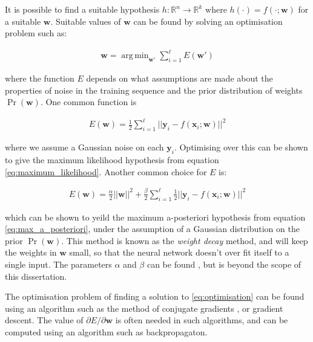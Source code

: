 \documentclass[12pt,twoside,notitlepage]{report}
\newcommand{\vc}[1]{\mathbf{#1}}
\newcommand{\bb}[1]{\mathbb{#1}}
\DeclareMathOperator*{\argmin}{arg\,min}
\begin{document}
                It is possible to find a suitable hypothesis $h:\bb{R}^n \rightarrow \bb{R}^k$ 
                where $h(\cdot) = f(\cdot;\vc{w})$ for a suitable $\vc{w}$. Suitable values of $\vc{w}$ can be found by 
                solving an optimisation problem such as:
                
                \begin{align}
                    \vc{w} = \argmin_{\vc{w}'} \sum\limits_{i=1}^\ell E(\vc{w'})
                    \label{eq:optimisation}
                \end{align}

                where the function $E$ depends on what assumptions are made about the properties of noise in the training sequence and the prior 
                distribution of weights $\Pr(\vc{w})$. One common function is 

                \begin{align}
                    E(\vc{w}) =  \frac{1}{2} \sum\limits_{i=1}^\ell || \vc{y}_i - f(\vc{x}_i;\vc{w}) || ^2
                \end{align}

                where we assume a Gaussian noise on each $\vc{y}_i$. Optimising over this can be shown to give the maximum
                likelihood hypothesis from equation \ref{eq:maximum_likelihood}\cite{russell1995modern}.
                Another common choice for $E$ is:

                \begin{align}
                    E(\vc{w}) = \frac{\alpha}{2} ||\vc{w}||^2 + \frac{\beta}{2} \sum\limits_{i=1}^\ell \frac{1}{2} || \vc{y}_i - f(\vc{x}_i;\vc{w}) || ^2
                 \end{align}

                 which can be shown to yeild the maximum a-posteriori hypothesis from equation \ref{eq:max_a_posteriori},
                 under the assumption of a Gaussian distribution on the prior $\Pr(\vc{w})$.
                 This method is known as the \textit{weight decay} method, and will keep the weights in $\vc{w}$ small, 
                 so that the neural network doesn't over fit itself to a single input. The parameters $\alpha$ and $\beta$ can be 
                 found \cite{eq:max_likelihood}, but is beyond the scope of this dissertation. \cite{russell1995modern}

                 The optimisation problem of finding a solution to \ref{eq:optimisation} can be found using an algorithm 
                 such as the method of conjugate gradients \cite{shewchuk1994introduction}, or gradient descent. 
                 The value of $\partial E/\partial \vc{w}$ is often needed in such algorithms, and can be computed using 
                 an algorithm such as backpropagaton. \cite{russell1995modern}
\end{document}
